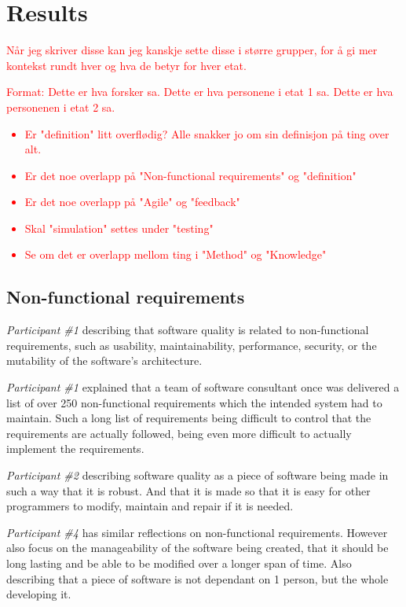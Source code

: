 \chapter{Results}

\textcolor{red}{Når jeg skriver disse kan jeg kanskje sette disse i større grupper, for å gi mer kontekst rundt hver og hva de betyr for hver etat.}

\textcolor{red}{Format: Dette er hva forsker sa. Dette er hva personene i etat 1 sa. Dette er hva personenen i etat 2 sa.}

\textcolor{red}{
\begin{itemize}
    \item Er "definition" litt overflødig? Alle snakker jo om sin definisjon på ting over alt.
    \item Er det noe overlapp på "Non-functional requirements" og "definition"
    \item Er det noe overlapp på "Agile" og "feedback"
    \item Skal "simulation" settes under "testing"
    \item Se om det er overlapp mellom ting i "Method" og "Knowledge"
\end{itemize}
}

\section{Non-functional requirements}
\textit{Participant \#1} describing that software quality is related to non-functional requirements, such as usability, maintainability, performance, security, or the mutability of the software's architecture. 

\textit{Participant \#1} explained that a team of software consultant once was delivered a list of over 250 non-functional requirements which the intended system had to maintain. Such a long list of requirements being difficult to control that the requirements are actually followed, being even more difficult to actually implement the requirements.

\textit{Participant \#2} describing software quality as a piece of software being made in such a way that it is robust. And that it is made so that it is easy for other programmers to modify, maintain and repair if it is needed.

\textit{Participant \#4} has similar reflections on non-functional requirements. However also focus on the manageability of the software being created, that it should be long lasting and be able to be modified over a longer span of time. Also describing that a piece of software is not dependant on 1 person, but the whole developing it. 

